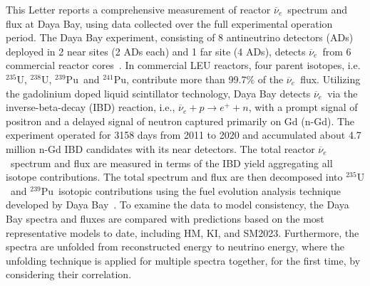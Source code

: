 \documentclass[aps,prl,showpacs,showkeys,amsmath,amssymb,twocolumn,floatfix,superscriptaddress,nofootinbib]{revtex4-1}
\newcommand{\Rnu}{$\overline{\nu}_e$}
\newcommand{\Ufive}{$\mathrm{^{235}U}$}
\newcommand{\Ueight}{$\mathrm{^{238}U}$}
\newcommand{\Punine}{$\mathrm{^{239}Pu}$}
\newcommand{\Puone}{$\mathrm{^{241}Pu}$}
\begin{document}
This Letter reports a comprehensive measurement of reactor \Rnu\ spectrum and flux at Daya Bay, using data collected over the full experimental operation period.
The Daya Bay experiment, consisting of 8 antineutrino detectors (ADs) deployed in 2 near sites (2 ADs each) and 1 far site (4 ADs), detects \Rnu\ from 6 commercial reactor cores~\cite{DayaBay_CPC_2016}.
In commercial LEU reactors, four parent isotopes, i.e. \Ufive, \Ueight, \Punine\ and \Puone, contribute more than 99.7$\%$ of the \Rnu\ flux.
Utilizing the gadolinium doped liquid scintillator technology, Daya Bay detects \Rnu\ via the inverse-beta-decay (IBD) reaction, i.e., $\overline{\nu}_e + p \rightarrow e^+ + n$, with a prompt signal of positron and a delayed signal of neutron captured primarily on Gd (n-Gd).
The experiment operated for 3158 days from 2011 to 2020 and accumulated about 4.7 million n-Gd IBD candidates with its near detectors.
The total reactor \Rnu\ spectrum and flux are measured in terms of the IBD yield aggregating all isotope contributions.
The total spectrum and flux are then decomposed into \Ufive\ and \Punine\ isotopic contributions using the fuel evolution analysis technique developed by Daya Bay~\cite{DayaBay_PRL_evolution2017, DayaBay_PRL_extraction}.
To examine the data to model consistency, the Daya Bay spectra and fluxes are compared with predictions based on the most representative models to date, including HM, KI, and SM2023.
Furthermore, the spectra are unfolded from reconstructed energy to neutrino energy, where the unfolding technique is applied for multiple spectra together, for the first time, by considering their correlation.






\end{document}
